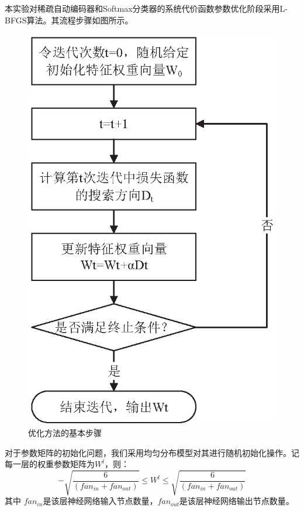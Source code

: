 \documentclass[oneside]{ZJUthesis}
\begin{document}
本实验对稀疏自动编码器和Softmax分类器的系统代价函数参数优化阶段采用L-BFGS算法\cite{nocedal1980updating,liu1989limited}。其流程步骤如图所示。
\begin{figure}[H]
\centering
\includegraphics[scale=0.7]{./Pictures/optimize.eps}
\caption{优化方法的基本步骤\label{fig:framework}}
\end{figure}
对于参数矩阵的初始化问题，我们采用均匀分布模型对其进行随机初始化操作。记每一层的权重参数矩阵为$W^l$，则：
\begin{equation}
  -\sqrt{\frac{6}{(fan_{in} + fan_{out})}} \le W^l \le \sqrt{\frac{6}{(fan_{in} + fan_{out})}}
\end{equation}
其中 $fan_{in}$是该层神经网络输入节点数量，$fan_{out}$是该层神经网络输出节点数量\cite{张娇2011基于}。
\end{document}
